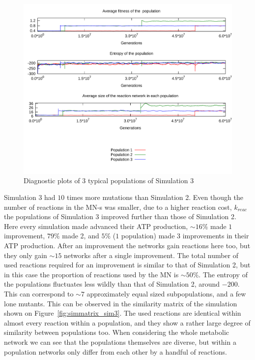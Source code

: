 \documentclass[a4paper,12pt]{article}
\begin{document}
\begin{figure}[htpb]
	\centering
	\includegraphics[width=0.8\linewidth]{simulation3.pdf}
	\caption{Diagnostic plots of 3 typical populations of Simulation 3}
	\label{fig:simulation3}
\end{figure}

Simulation 3 had $10$ times more mutations than Simulation 2. Even though the number of reactions in the MN-s was smaller, due to a higher reaction cost, $k_{reac}$ the populations of Simulation 3 improved further than those of Simulation 2. Here every simulation made advanced their ATP production, $\sim 16\%$ made $1$ improvement, $79\%$ made 2, and $5\%$ ($1$ population) made $3$ improvements in their ATP production. After an improvement the networks gain reactions here too, but they only gain $\sim 15$ networks after a single improvement. The total number of used reactions required for an improvement is similar to that of Simulation 2, but in this case the proportion of reactions used by the MN is $\sim 50\%$. The entropy of the populations fluctuates less wildly than that of Simulation 2, around $-200$. This can correspond to $\sim 7$ approximately equal sized subpopulations, and a few lone mutants. This can be observed in the similarity matrix of the simulation shown on Figure~\ref{fig:simmatrix_sim3}. The used reactions are identical within almost every reaction within a population, and they show a rather large degree of similarity between populations too. When considering the whole metabolic network we can see that the populations themselves are diverse, but within a population networks only differ from each other by a handful of reactions. 
\end{document}

